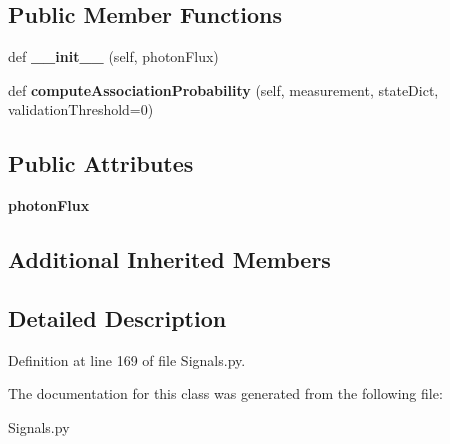 \subsection*{Public Member Functions}
\begin{DoxyCompactItemize}
\item 
def {\bfseries \+\_\+\+\_\+init\+\_\+\+\_\+} (self, photon\+Flux)\hypertarget{classSignals_1_1UniformNoiseXRaySource_a15d841ccc30dc405ec880bf73c306078}{}\label{classSignals_1_1UniformNoiseXRaySource_a15d841ccc30dc405ec880bf73c306078}

\item 
def {\bfseries compute\+Association\+Probability} (self, measurement, state\+Dict, validation\+Threshold=0)\hypertarget{classSignals_1_1UniformNoiseXRaySource_abe8f54c9edf95865afe7853c295d33bd}{}\label{classSignals_1_1UniformNoiseXRaySource_abe8f54c9edf95865afe7853c295d33bd}

\end{DoxyCompactItemize}
\subsection*{Public Attributes}
\begin{DoxyCompactItemize}
\item 
{\bfseries photon\+Flux}\hypertarget{classSignals_1_1UniformNoiseXRaySource_af240be1882d819db77da73100c4c95c5}{}\label{classSignals_1_1UniformNoiseXRaySource_af240be1882d819db77da73100c4c95c5}

\end{DoxyCompactItemize}
\subsection*{Additional Inherited Members}


\subsection{Detailed Description}


Definition at line 169 of file Signals.\+py.



The documentation for this class was generated from the following file\+:\begin{DoxyCompactItemize}
\item 
Signals.\+py\end{DoxyCompactItemize}
